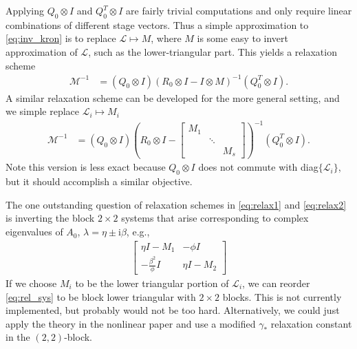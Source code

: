 \documentclass[a4paper,10pt]{article}
\begin{document}
%
Applying $Q_0\otimes I$ and $Q_0^T\otimes I$ are fairly trivial computations
and only require linear combinations of different stage vectors. Thus a
simple approximation to \eqref{eq:inv_kron} is to replace $\mathcal{L} \mapsto
M$, where $M$ is some easy to invert approximation of $\mathcal{L}$, such as
the lower-triangular part. This yields a relaxation scheme
%
\begin{align}\label{eq:relax1}
\mathcal{M}^{-1} & = (Q_0\otimes I) \left( R_0\otimes I - 
	I\otimes {M}\right)^{-1}(Q_0^T\otimes I).
\end{align}
%
A similar relaxation scheme can be developed for the more general setting, and
we simple replace $\mathcal{L}_i\mapsto M_i$
%
\begin{align}\label{eq:relax2}
\mathcal{M}^{-1} & = (Q_0\otimes I) \left( R_0\otimes I - 
	\begin{bmatrix} M_1 \\ & \ddots \\ && M_s\end{bmatrix} \right)^{-1}(Q_0^T\otimes I).
\end{align}
%
Note this version is less exact because $Q_0\otimes I$ does not commute with
diag$\{\mathcal{L}_i\}$, but it should accomplish a similar objective.

The one outstanding question of relaxation schemes in \eqref{eq:relax1} and
\eqref{eq:relax2} is inverting the block $2\times 2$ systems that arise
corresponding to complex eigenvalues of $A_0$, $\lambda = \eta \pm \mathrm{i}\beta$,
e.g.,
%
\begin{align}\label{eq:rel_sys}
\begin{bmatrix} \eta I - M_1 & -\phi I \\ -\frac{\beta^2}{\phi}I & \eta I - M_2 \end{bmatrix}
\end{align}
%
If we choose $M_i$ to be the lower triangular portion of $\mathcal{L}_i$, we
can reorder \eqref{eq:rel_sys} to be block lower triangular with $2\times 2$
blocks. This is not currently implemented, but probably would not be too hard.
Alternatively, we could just apply the theory in the nonlinear paper and use
a modified $\gamma_*$ relaxation constant in the $(2,2)$-block.
\end{document}
